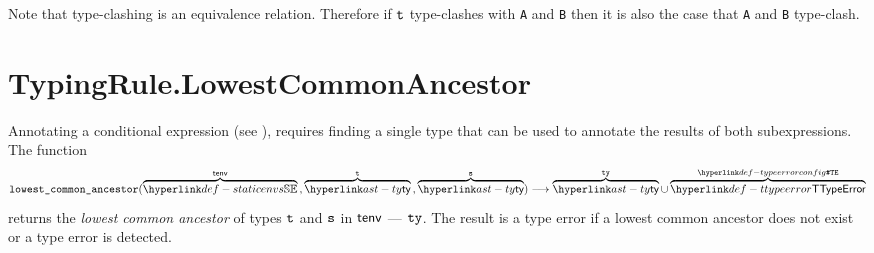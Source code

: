 Note that type-clashing is an equivalence relation. Therefore if $\texttt{t}$
type-clashes with \texttt{A} and \texttt{B} then it is also the case that \texttt{A} and \texttt{B} type-clash.


\section{TypingRule.LowestCommonAncestor \label{sec:TypingRule.LowestCommonAncestor}}
\hypertarget{def-lowestcommonancestor}{}
Annotating a conditional expression (see ),
requires finding a single type that can be used to annotate the results of both subexpressions.
The function
\[
  \lca(\overname{\staticenvs}{\tenv} \aslsep \overname{\ty}{\vt} \aslsep \overname{\ty}{\vs})
  \aslto \overname{\ty}{\tty} \cup \overname{\TTypeError}{\TypeErrorConfig}
\]
returns the \emph{lowest common ancestor} of types $\texttt{t}$ and $\texttt{s}$ in $\textsf{tenv}$ --- $\texttt{ty}$.
The result is a type error if a lowest common ancestor does not exist or a type error is detected.

